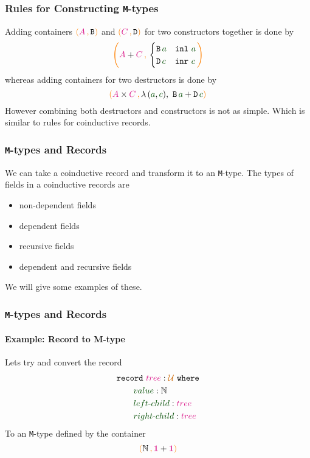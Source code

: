 \documentclass[xelatex,mathserif,serif,notheorems]{beamer} %
\theoremstyle{plain} %
\theoremstyle{definition}
\theoremstyle{remark}
\newcommand*{\term}[1]{\textcolor{green!30!black}{#1}} %
\newcommand*{\type}[1]{\textcolor{magenta!90!black}{#1}}
\newcommand*{\containerpair}[2]{\ensuremath{\colorlet{savedleftcolor}{.}\color{orange}\left(\color{savedleftcolor}#1\,\textcolor{orange}{\mathbf{,}}\,#2\color{orange}\right)\color{savedleftcolor}}}
\newcommand*{\universe}[1]{\textcolor{orange!80!black}{#1}}
\newcommand*{\unit}{\type{\textbf{1}}}
\newcommand*{\typeformer}[1]{\ensuremath{\mathtt{#1}}}
\begin{document}
\begin{frame}
  \frametitle{Rules for Constructing \texttt{M}-types}
  Adding containers \(\containerpair{\type{A}}{\typeformer{B}}\) and \(\containerpair{\type{C}}{\typeformer{D}}\) for two constructors together is done by
  \begin{equation}
    \containerpair{\type{A} + \type{C}}{ \begin{cases} \typeformer{B}\,\term{a} & \mathtt{inl}~\term{a} \\ \typeformer{D}\,\term{c} & \mathtt{inr}~\term{c} \end{cases}}
  \end{equation}
  whereas adding containers for two destructors is done by
  \begin{equation}
    \containerpair{\type{A} \times \type{C}}{\lambda\,(\term{a},\term{c}),~\typeformer{B}\,\term{a} + \typeformer{D}\,\term{c}}  
  \end{equation}
  However combining both destructors and constructors is not as simple. Which is similar to rules for coinductive records.
\end{frame}

\begin{frame}
  \frametitle{\texttt{M}-types and Records}
  We can take a coinductive record and transform it to an \texttt{M}-type. The types of fields in a coinductive records are
  \begin{itemize}
  \item non-dependent fields
  \item dependent fields
  \item recursive fields
  \item dependent and recursive fields
  \end{itemize}
  We will give some examples of these.
\end{frame}

\begin{frame}
  \frametitle{\texttt{M}-types and Records}
  \framesubtitle{Example: Record to M-type}
  Lets try and convert the record
  \begin{equation}
    \begin{aligned}
      &\mathtt{record}~\type{tree} : \universe{\mathcal{U} }~\mathtt{where} \\
      &\qquad \term{value} : \mathbb{N} \\
      &\qquad \term{left\text{-}child} : \type{tree} \\
      &\qquad \term{right\text{-}child} : \type{tree}
    \end{aligned}
  \end{equation}
  To an \texttt{M}-type defined by the container
  \begin{equation}
    \containerpair{\mathbb{N}}{\unit + \unit}
  \end{equation}
\end{frame}
\end{document}
